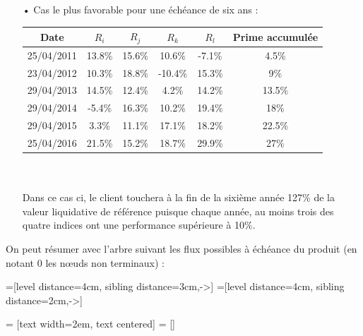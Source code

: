 \documentclass[french,12pt,a4paper]{article}
\begin{document}
\begin{itemize}
\newpage
\item[•]
Cas le plus favorable pour une échéance de six ans :\\
\begin{spacing}{1.2}
\begin{center}
\begin{tabular}{|c|c|c|c|c|c|}
  \hline
  Date & $R_{i}$ & $R_{j}$ & $R_{k}$ & $R_{l}$ & Prime accumulée \\
  \hline
  25/04/2011 & 13.8\% & 15.6\% & 10.6\% & -7.1\% & 4.5\% \\
  23/04/2012 & 10.3\% & 18.8\% & -10.4\% & 15.3\% & 9\% \\
  29/04/2013 & 14.5\% & 12.4\% & 4.2\% & 14.2\% & 13.5\%\\
  29/04/2014 & -5.4\% & 16.3\% & 10.2\% & 19.4\% & 18\%\\
  29/04/2015 & 3.3\% & 11.1\% & 17.1\% & 18.2\% & 22.5\%\\
  25/04/2016 & 21.5\% & 15.2\% & 18.7\% & 29.9\% & 27\%\\
  \hline
\end{tabular}
\end{center}
\end{spacing}
\indent \\
\indent \\
Dans ce cas ci, le client touchera à la fin de la sixième année 127\% de la valeur liquidative de référence puisque chaque année, au moins trois des quatre indices ont une performance supérieure à 10\%.\\
\end{itemize}

\noindent On peut résumer avec l'arbre suivant les flux possibles à échéance du produit (en notant 0 les nœuds non terminaux)  :

=[level distance=4cm, sibling distance=3cm,->]
=[level distance=4cm, sibling distance=2cm,->]

 = [text width=2em, text centered]
 = []
\end{document}
